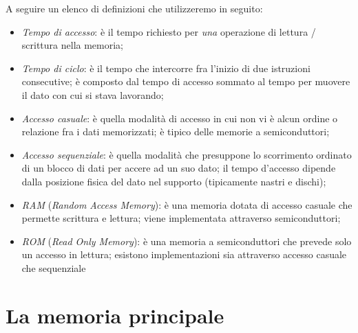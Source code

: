 \documentclass[class=book, crop=false, oneside]{standalone}
\begin{document}
A seguire un elenco di definizioni che utilizzeremo in seguito:
\begin{itemize}
	\item \emph{Tempo di accesso}: è il tempo richiesto per \emph{una} operazione di lettura / scrittura nella memoria;
	\item \emph{Tempo di ciclo}: è il tempo che intercorre fra l'inizio di due istruzioni consecutive; è composto dal tempo di accesso sommato al tempo per muovere il dato con cui si stava lavorando;
	\item \emph{Accesso casuale}: è quella modalità di accesso in cui non vi è alcun ordine o relazione fra i dati memorizzati; è tipico delle memorie a semiconduttori;
	\item \emph{Accesso sequenziale}: è quella modalità che presuppone lo scorrimento ordinato di un blocco di dati per accere ad un suo dato; il tempo d'accesso dipende dalla posizione fisica del dato nel supporto (tipicamente nastri e dischi);
	\item \emph{RAM} (\emph{Random Access Memory}): è una memoria dotata di accesso casuale che permette scrittura e lettura; viene implementata attraverso semiconduttori;
	\item \emph{ROM} (\emph{Read Only Memory}): è una memoria a semiconduttori che prevede solo un accesso in lettura; esistono implementazioni sia attraverso accesso casuale che sequenziale
\end{itemize}

\section{La memoria principale}
\end{document}
